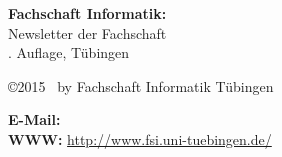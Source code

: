 \thispagestyle{empty}

\textbf{Fachschaft Informatik:}\\
Newsletter der Fachschaft\\
\number\auflage. %
Auf\/lage, Tübingen \number\jahr\\[1cm]

\vfill

\copyright 2015 %
~by Fachschaft Informatik Tübingen\\

\medskip

\textbf{E-Mail:} \hfill
{}\\
\textbf{WWW:} \hfill
\url{http://www.fsi.uni-tuebingen.de/}
\newpage